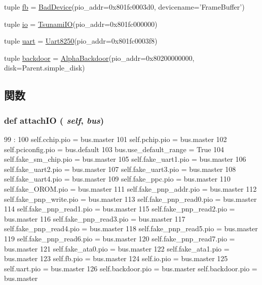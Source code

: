 \begin{DoxyCompactItemize}
\item 
tuple \hyperlink{classTsunami_1_1Tsunami_ab69ff40cdffeeb758945921ff6accded}{fb} = \hyperlink{classBadDevice}{BadDevice}(pio\_\-addr=0x801fc0003d0, devicename='FrameBuffer')
\item 
tuple \hyperlink{classTsunami_1_1Tsunami_a2c4f3d37bf2004da1c3daf41d84880f4}{io} = \hyperlink{classTsunami_1_1TsunamiIO}{TsunamiIO}(pio\_\-addr=0x801fc000000)
\item 
tuple \hyperlink{classTsunami_1_1Tsunami_a1f69fbabd17d6bca63f97f9754247cfd}{uart} = \hyperlink{classUart8250}{Uart8250}(pio\_\-addr=0x801fc0003f8)
\item 
tuple \hyperlink{classTsunami_1_1Tsunami_ad1cd7522c6e6eb425785dc89f1b36856}{backdoor} = \hyperlink{classAlphaBackdoor}{AlphaBackdoor}(pio\_\-addr=0x80200000000, disk=Parent.simple\_\-disk)
\end{DoxyCompactItemize}


\subsection{関数}
\hypertarget{classTsunami_1_1Tsunami_ac750675f6d6de3ad52f8c5b03ee45a65}{
\subsubsection[{attachIO}]{\setlength{\rightskip}{0pt plus 5cm}def attachIO ( {\em self}, \/   {\em bus})}}
\label{classTsunami_1_1Tsunami_ac750675f6d6de3ad52f8c5b03ee45a65}



\begin{DoxyCode}
99                            :
100         self.cchip.pio = bus.master
101         self.pchip.pio = bus.master
102         self.pciconfig.pio = bus.default
103         bus.use_default_range = True
104         self.fake_sm_chip.pio = bus.master
105         self.fake_uart1.pio = bus.master
106         self.fake_uart2.pio = bus.master
107         self.fake_uart3.pio = bus.master
108         self.fake_uart4.pio = bus.master
109         self.fake_ppc.pio = bus.master
110         self.fake_OROM.pio = bus.master
111         self.fake_pnp_addr.pio = bus.master
112         self.fake_pnp_write.pio = bus.master
113         self.fake_pnp_read0.pio = bus.master
114         self.fake_pnp_read1.pio = bus.master
115         self.fake_pnp_read2.pio = bus.master
116         self.fake_pnp_read3.pio = bus.master
117         self.fake_pnp_read4.pio = bus.master
118         self.fake_pnp_read5.pio = bus.master
119         self.fake_pnp_read6.pio = bus.master
120         self.fake_pnp_read7.pio = bus.master
121         self.fake_ata0.pio = bus.master
122         self.fake_ata1.pio = bus.master
123         self.fb.pio = bus.master
124         self.io.pio = bus.master
125         self.uart.pio = bus.master
126         self.backdoor.pio = bus.master
        self.backdoor.pio = bus.master
\end{DoxyCode}


